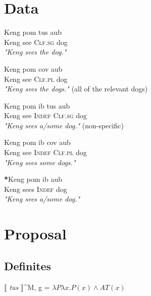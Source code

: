 \documentclass[a4paper,11pt]{article}
\begin{document}
\section{Data}

\begin{exe}
\ex \gll Keng pom tus aub \\
	Keng see \textsc{Clf.sg} dog \\
\glt \textit{"Keng sees the dog."}
\end{exe}

\begin{exe}
\ex \gll Keng pom cov aub \\
	Keng see \textsc{Clf.pl} dog \\
\glt \textit{"Keng sees the dogs."} (all of the relevant dogs)
\end{exe}

\begin{exe}
\ex \gll Keng pom ib tus aub \\
	Keng see \textsc{Indef} \textsc{Clf.sg} dog \\
\glt \textit{"Keng sees a/some dog."} (non-specific)
\end{exe}

\begin{exe}
\ex \gll Keng pom ib cov aub \\
	Keng see \textsc{Indef} \textsc{Clf.pl} dog \\
\glt \textit{"Keng sees some dogs."}
\end{exe}

\begin{exe}
\ex \gll \textbf{*}Keng pom ib aub \\
	Keng sees \textsc{Indef} dog \\
\glt \textit{"Keng sees a/some dog."}
\end{exe}




\section{Proposal}

\subsection{Definites}


\begin{exe}
\ex $\llbracket$ \textit{tus} $\rrbracket$^{M, g} = $\lambda P\lambda x.P(x) \land AT(x)$
\end{exe}
\end{document}
